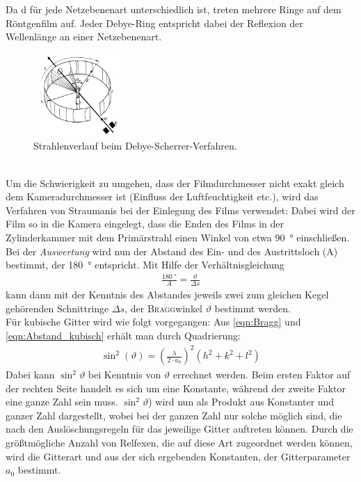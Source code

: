 \documentclass[a4paper,twoside,final]{article}
\begin{document}
Da d für jede Netzebenenart unterschiedlich ist, treten mehrere Ringe auf dem Röntgenfilm auf. Jeder Debye-Ring entspricht dabei der Reflexion der Wellenlänge an einer Netzebenenart.
\begin{figure}[htp]
    \centering
    \includegraphics[width=0.3\textwidth]{Abbildungen/Debye-Sherrer-Kamera.pdf}
    \caption{Strahlenverlauf beim Debye-Scherrer-Verfahren.~\cite[S.375]{Kleber}}
    \label{fig:Debye-Kamera}
\end{figure}\\
Um die Schwierigkeit zu umgehen, dass der Filmdurchmesser nicht exakt gleich dem Kameradurchmesser ist (Einfluss der Luftfeuchtigkeit etc.), wird das Verfahren von Straumanis bei der Einlegung des Films verwendet: Dabei wird der Film so in die Kamera eingelegt, dass die Enden des Films in der Zylinderkammer mit dem Primärstrahl einen Winkel von etwa \SI{90}{\degree} einschließen.\\
Bei der \textit{Auswertung} wird nun der Abstand des Ein- und des Austrittsloch (A) bestimmt, der \SI{180}{\degree} entspricht. Mit Hilfe der Verhältnisgleichung
\begin{align}
  \frac{\SI{180}{\degree}}{A} = \frac{\vartheta}{\Delta s}\label{eqn:Verhältnisgleichung}
\end{align}
kann dann mit der Kenntnis des Abstandes jeweils zwei zum gleichen Kegel gehörenden Schnittringe $\Delta s$, der \textsc{Bragg}winkel $\vartheta$ bestimmt werden. \\
Für kubische Gitter wird wie folgt vorgegangen: Aus \eqref{eqn:Bragg} und \eqref{eqn:Abstand_kubisch} erhält man durch Quadrierung:
\begin{align}
  \sin^2(\vartheta) = \left(\frac{\lambda}{2\cdot a_0}\right)^2 (h^2+k^2+l^2)
\end{align}
Dabei kann $\sin^2\vartheta$ bei Kenntnis von $\vartheta$ errechnet werden. Beim ersten Faktor auf der rechten Seite handelt es sich um eine Konstante, während der zweite Faktor eine ganze Zahl sein muss. $\sin^2\vartheta$) wird nun als Produkt aus Konstanter und ganzer Zahl dargestellt, wobei bei der ganzen Zahl nur solche möglich sind, die nach den Auslöschungsregeln für das jeweilige Gitter auftreten können. Durch die größtmögliche Anzahl von Relfexen, die auf diese Art zugeordnet werden können, wird die Gitterart und aus der sich ergebenden Konstanten, der Gitterparameter $a_0$ bestimmt.
\end{document}
